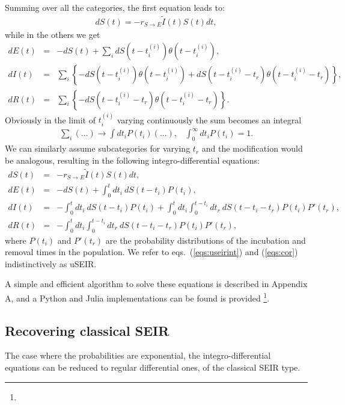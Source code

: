 \documentclass[a4paper,oneside,11pt]{article}
\begin{document}
Summing over all the categories, the first equation leads to:
\begin{eqnarray}
d S(t) = - r_{S\rightarrow E} \tilde{I}(t) S(t) dt,
\end{eqnarray}
while in the others we get
\begin{eqnarray}
d E(t) &=& -d S(t) + \sum_i d S(t-t^{(i)}_i) \theta(t-t^{(i)}_i) ,\nonumber\\
d I(t) &=& \sum_i  \left\{-d S(t-t^{(i)}_i) \theta(t-t^{(i)}_i)+ d S(t-t^{(i)}_i-t_r) \theta(t-t^{(i)}_i-t_r)\right\},\nonumber\\
d R(t) &=& \sum_i \left\{- d S(t - t^{(i)}_i - t_r) \theta(t-t^{(i)}_i-t_r)\right\}.
\label{eqs:corint}
\end{eqnarray}
Obviously in the limit of $t_i^{(i)}$ varying continuously the sum becomes an integral
\begin{eqnarray}
\sum_i  (...) \rightarrow \int dt_i P(t_i) (...), \;\;\; \int_0^\infty dt_i P(t_i) = 1.
\end{eqnarray}
We can similarly assume subcategories for varying $t_r$ and the modification would be analogous, resulting in the following integro-differential equations:
\begin{eqnarray}
d S(t) &=& - r_{S\rightarrow E} \tilde{I}(t) S(t) dt,\nonumber\\
d E(t) &=& -d S(t) + \int_0^{t} dt_i ~d S(t-t_i) P(t_i) ,\nonumber\\
d I(t) &=& -\int_0^{t} dt_i  ~d S(t-t_i) P(t_i) + \int_0^{t} d t_i \int_0^{t-t_i} dt_r~ dS(t-t_i-t_r) P(t_i) P'(t_r),\nonumber\\
d R(t) &=& -\int_0^{t} d t_i \int_0^{t-t_i} dt_r~ dS(t-t_i-t_r) P(t_i) P'(t_r),
\label{eqs:useirint}
\end{eqnarray}
where $P(t_i)$ and $P'(t_r)$ are the probability distributions of the incubation and removal times in the population. We refer to eqs.~(\ref{eqs:useirint}) and (\ref{eqs:cor}) indistinctively as uSEIR.

A simple and efficient algorithm to solve these equations is described in Appendix A, and a Python and Julia implementations can be found is provided \footnote{}.




\subsection{Recovering classical SEIR}

The case where the probabilities are exponential, the integro-differential equations can be reduced to regular differential ones, of the classical SEIR type.
\end{document}
